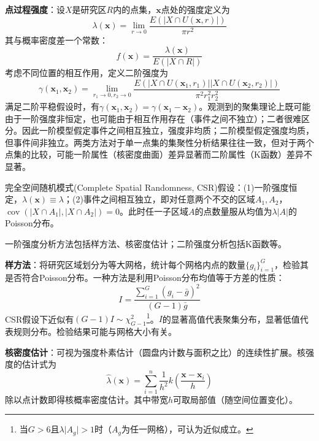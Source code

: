 \par \textbf{点过程强度}：设$X$是研究区$R$内的点集，$\mathbf{x}$点处的强度定义为
\begin{equation*}
\lambda(\mathbf{x})=\lim\limits_{r\to 0}\frac{E(\vert X\cap U(\mathbf{x},r) \vert)}{\pi r^2}
\end{equation*}
其与概率密度差一个常数：
\begin{equation}
f(\mathbf{x})=\frac{\lambda(\mathbf{x})}{E(\vert X\cap R \vert)}
\end{equation}
考虑不同位置的相互作用，定义二阶强度为
\begin{equation*}
\gamma(\mathbf{x}_1,\mathbf{x}_2)=\lim\limits_{r_1\to 0,r_2\to 0}\frac{E(\vert X\cap U(\mathbf{x}_1,r_1) \vert\vert X\cap U(\mathbf{x}_2,r_2) \vert)}{\pi^2 r_1^2r_2^2}
\end{equation*}
满足二阶平稳假设时，有$\gamma(\mathbf{x}_1,\mathbf{x}_2)=\gamma(\mathbf{x}_1-\mathbf{x}_2)$。观测到的聚集理论上既可能由于一阶强度非恒定，也可能由于相互作用存在（事件之间不独立）；二者很难区分。因此一阶模型假定事件之间相互独立，强度非均质；二阶模型假定强度均质，但事件间非独立。两类方法对于单一点集的集聚性分析结果往往一致，但对于两个点集的比较，可能一阶属性（核密度曲面）差异显著而二阶属性（K函数）差异不显著。

\par 完全空间随机模式(Complete Spatial Randomness, CSR)假设：(1)一阶强度恒定，$\lambda(\mathbf{x})\equiv \lambda$；(2)事件之间相互独立，即对任意两个不交的区域$A_1,A_2$，$\operatorname{cov}(\vert X\cap A_1\vert,\vert X\cap A_2\vert)=0$。此时任一子区域$A$的点数量服从均值为$\lambda \vert A \vert$的Poisson分布。

\par 一阶强度分析方法包括样方法、核密度估计；二阶强度分析包括K函数等。

\par \textbf{样方法}：将研究区域划分为等大网格，统计每个网格内点的数量$\{g_i\}_{i=1}^G$，检验其是否符合Poisson分布。一种方法是利用Poisson分布均值等于方差的性质：
\begin{equation}
    I = \frac{\sum_{i=1}^G (g_i-\bar{g})^2}{(G-1)\bar{g}}
\end{equation}
CSR假设下近似有$(G-1)I \sim \chi_{G-1}^2$\footnote{当$G>6$且$\lambda\vert A_g\vert>1$时（$A_g$为任一网格），可认为近似成立。}。$I$的显著高值代表聚集分布，显著低值代表规则分布。检验结果可能与网格大小有关。

\par \textbf{核密度估计}：可视为强度朴素估计（圆盘内计数与面积之比）的连续性扩展。核强度的估计式为
\begin{equation}
    \hat{\lambda}(\mathbf{x})=\sum_{i=1}^n \frac{1}{h^2} k\left(\frac{\mathbf{x}-\mathbf{x}_i}{h}\right)
\end{equation}
除以点计数即得核概率密度估计。其中带宽$h$可取局部值（随空间位置变化）。

